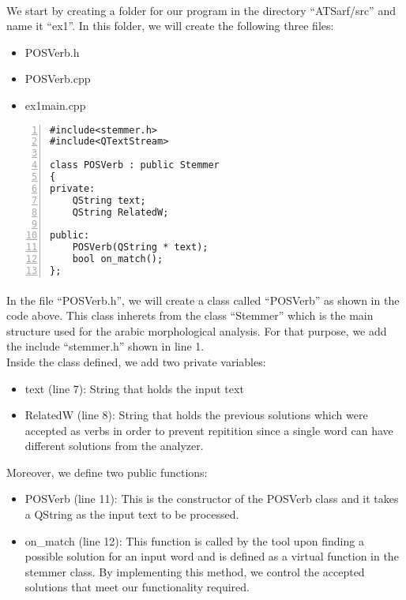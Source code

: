 \documentclass{article}
\begin{document}
\paragraph{}
We start by creating a folder for our program in the directory ``ATSarf/src'' and name it ``ex1''. In this folder, we will create the following three files:
\begin{itemize}
\item POSVerb.h
\item POSVerb.cpp
\item ex1main.cpp
\end{itemize}

\begin{Verbatim}[numbers=left]
#include<stemmer.h>
#include<QTextStream>

class POSVerb : public Stemmer
{
private:
    QString text;
    QString RelatedW;

public:
    POSVerb(QString * text);
    bool on_match();
};
\end{Verbatim}

\paragraph{}
In the file ``POSVerb.h'', we will create a class called ``POSVerb'' as shown in the code above. This class inherets from the class ``Stemmer'' which is the main structure used for the arabic morphological analysis. For that purpose, we add the include ``stemmer.h'' shown in line 1.\\

Inside the class defined, we add two private variables:
\begin{itemize}
\item text (line 7): String that holds the input text
\item RelatedW (line 8): String that holds the previous solutions which were accepted as verbs in order to prevent repitition since a single word can have different solutions from the analyzer.
\end{itemize}

Moreover, we define two public functions:
\begin{itemize}
\item POSVerb (line 11): This is the constructor of the POSVerb class and it takes a QString as the input text to be processed.
\item on\_match (line 12): This function is called by the tool upon finding a possible solution for an input word and is defined as a virtual function in the stemmer class. By implementing this method, we control the accepted solutions that meet our functionality required.
\end{itemize}
\end{document}
